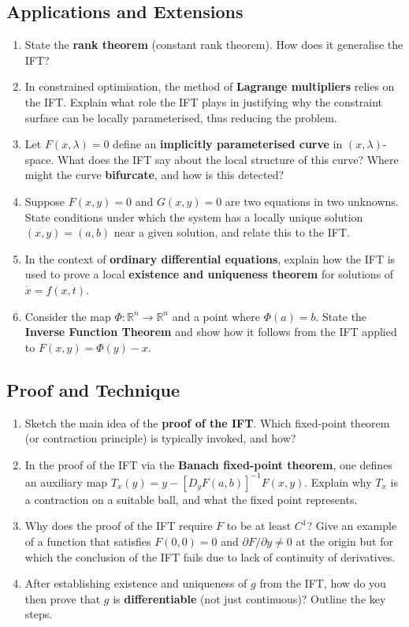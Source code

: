\subsection{Applications and Extensions}

\begin{enumerate}[resume, leftmargin=*, label=\textbf{Q\arabic*.}]
  \item State the \textbf{rank theorem} (constant rank theorem). How does it generalise the IFT?
  \item In constrained optimisation, the method of \textbf{Lagrange multipliers} relies on the IFT. Explain what role the IFT plays in justifying why the constraint surface can be locally parameterised, thus reducing the problem.
  \item Let $F(x, \lambda) = 0$ define an \textbf{implicitly parameterised curve} in $(x,\lambda)$-space. What does the IFT say about the local structure of this curve? Where might the curve \textbf{bifurcate}, and how is this detected?
  \item Suppose $F(x,y) = 0$ and $G(x,y) = 0$ are two equations in two unknowns. State conditions under which the system has a locally unique solution $(x,y) = (a,b)$ near a given solution, and relate this to the IFT.
  \item In the context of \textbf{ordinary differential equations}, explain how the IFT is used to prove a local \textbf{existence and uniqueness theorem} for solutions of $\dot{x} = f(x,t)$.
  \item Consider the map $\Phi : \mathbb{R}^n \to \mathbb{R}^n$ and a point where $\Phi(a) = b$. State the \textbf{Inverse Function Theorem} and show how it follows from the IFT applied to $F(x,y) = \Phi(y) - x$.
\end{enumerate}

\subsection{Proof and Technique}

\begin{enumerate}[resume, leftmargin=*, label=\textbf{Q\arabic*.}]
  \item Sketch the main idea of the \textbf{proof of the IFT}. Which fixed-point theorem (or contraction principle) is typically invoked, and how?
  \item In the proof of the IFT via the \textbf{Banach fixed-point theorem}, one defines an auxiliary map $T_x(y) = y - [D_y F(a,b)]^{-1} F(x,y)$. Explain why $T_x$ is a contraction on a suitable ball, and what the fixed point represents.
  \item Why does the proof of the IFT require $F$ to be at least $C^1$? Give an example of a function that satisfies $F(0,0) = 0$ and $\partial F/\partial y \neq 0$ at the origin but for which the conclusion of the IFT fails due to lack of continuity of derivatives.
  \item After establishing existence and uniqueness of $g$ from the IFT, how do you then prove that $g$ is \textbf{differentiable} (not just continuous)? Outline the key steps.
\end{enumerate}


